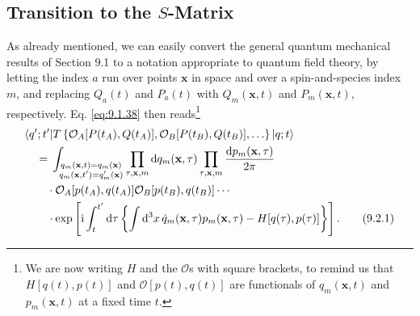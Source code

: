 
\subsection{\texorpdfstring{Transition to the $S$-Matrix}{Transition to the S-Matrix}}

As already mentioned, we can easily convert the general quantum mechanical
results of Section 9.1 to a notation appropriate to quantum field theory, by
letting the index $a$ run over points $\mathbf{x}$ in space and over a
spin-and-species index $m$, and replacing $Q_a(t)$ and $P_a(t)$ with
$Q_m(\mathbf{x},t)$ and $P_m(\mathbf{x},t)$, respectively. Eq. \eqref{eq:9.1.38}
then reads\footnote{We are now writing $H$ and the $\mathcal{O}$s with
square brackets, to remind us that $H[q(t),p(t)]$ and
$\mathcal{O}[p(t),q(t)]$ are functionals of $q_m(\mathbf{x},t)$ and
$p_m(\mathbf{x},t)$ at a fixed time $t$.}
\begin{align}
  &\langle q';t'\rvert T\left\{\mathcal{O}_A[P(t_A),Q(t_A)],
  \mathcal{O}_B[P(t_B),Q(t_B)],\ldots\right\}\lvert q;t\rangle
  \notag\\
  &\quad={}
  \int_{\substack{q_m(\mathbf{x},t)=q_m(\mathbf{x})\\
                  q_m(\mathbf{x},t')=q'_m(\mathbf{x})}}
  \prod_{\tau,\mathbf{x},m}\mathop{}\!\mathrm{d} q_m(\mathbf{x},\tau)
  \prod_{\tau,\mathbf{x},m}\frac{\mathop{}\!\mathrm{d} p_m(\mathbf{x},\tau)}{2\pi}
  \notag\\
  &\qquad\cdot
  \mathcal{O}_A[p(t_A),q(t_A)]\mathcal{O}_B[p(t_B),q(t_B)]\cdots
  \notag\\
  &\qquad\cdot\exp\left[\mathrm{i}\int_t^{t'}\mathop{}\!\mathrm{d}\tau
  \left\{\int \mathop{}\!\mathrm{d}^3x\,\dot q_m(\mathbf{x},\tau)p_m(\mathbf{x},\tau)
  -H[q(\tau),p(\tau)]\right\}\right].
  \tag{9.2.1}\label{eq:9.2.1}
\end{align}

